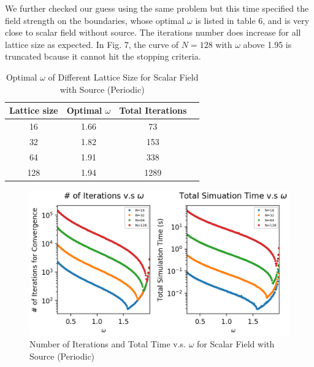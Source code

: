 \documentclass[a4paper,10pt]{article}
\begin{document}
\begin{large}
We further checked our guess using the same problem but this time specified the field strength on the boundaries, whose optimal $\omega$ is listed in table 6, and is very close to scalar field without source. The iterations number does increase for all lattice size as expected. In Fig. 7, the curve of $N=128$ with $\omega$ above 1.95 is truncated bcause it cannot hit the stopping criteria.

\begin{table}[h]  %
\centering  %
\begin{tabular}[t]{|c|c|c|c|}
\hline
Lattice size&Optimal $\omega$& Total Iterations\\
\hline
16&1.66&73\\
\hline
32&1.82&153\\
\hline
64&1.91&338\\
\hline
128& 1.94&1289\\
\hline
\end{tabular}
\caption{Optimal $\omega$ of Different Lattice Size for Scalar Field with Source (Periodic)}  %
\end{table}

\begin{figure}[htbp] %
\centering %
\includegraphics[width=15cm]{Problem_2_Optimal_omega_with_Charge_Periodic.png} %
\caption{Number of Iterations and Total Time v.s. $\omega$ for Scalar Field with Source (Periodic)}
\end{figure}


\end{large}
\end{document}
